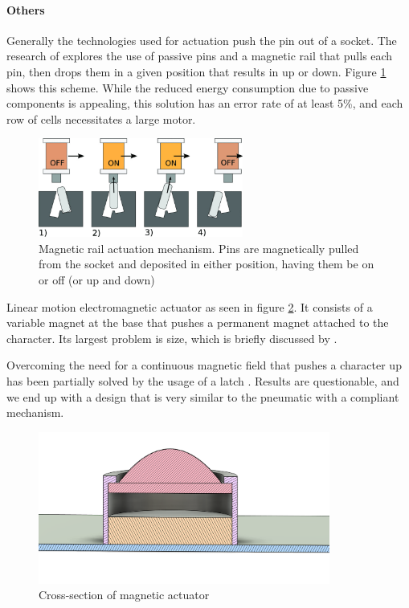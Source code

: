    \paragraph{Others} %
    Generally the technologies used for actuation push the pin out of a socket.
    The research of \cite{loconsole_braillecursor_2019} explores the use of passive pins and a magnetic rail that pulls each pin, then drops them in a given position that results in up or down. Figure \ref{fig:magnetic-rail} shows this scheme.
    While the reduced energy consumption due to passive components is appealing, this solution has an error rate of at least 5\%, and each row of cells necessitates a large motor.
    \begin{figure}[h]
    \centering
        \includegraphics[width=0.6\textwidth]{figures/magnetic-rail.jpg}
    \caption{Magnetic rail actuation mechanism. Pins are magnetically pulled from the socket and deposited in either position, having them be on or off (or up and down)}
    \label{fig:magnetic-rail}
    \end{figure}  

    Linear motion electromagnetic actuator as seen in figure \ref{fig:magnet-cross_section.png}.
    It consists of a variable magnet at the base that pushes a permanent magnet attached to the character. Its largest problem is size, which is briefly discussed by \cite{BettelaniGemmaCarolina2020DaVo}.


    Overcoming the need for a continuous magnetic field that pushes a character up has been partially solved by the usage of a latch \cite{KimJoonyeong2020BDfP}. Results are questionable, and we end up with a design that is very similar to the pneumatic with a compliant mechanism.


    \begin{figure}[h]
    \centering
        \includegraphics[height=5cm]{figures/magnet-cross_section.png}
    \caption{Cross-section of magnetic actuator}
    \label{fig:magnet-cross_section.png}
    \end{figure}


